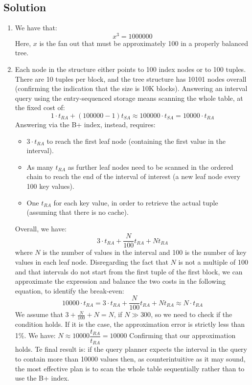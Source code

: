 \subsection*{Solution}
\begin{enumerate}
    \item We have that: 
        \[x^3=1000000\]
        Here, $x$ is the fan out that must be approximately 100 in a properly balanced tree.
    \item Each node in the structure either points to 100 index nodes or to 100 tuples. 
        There are 10 tuples per block, and the tree structure has 10101 nodes overall (confirming the indication that the size is 10K blocks).
        Answering an interval query using the entry-sequenced storage means scanning the whole table, at the fixed cost of: 
        \[1\cdot t_{RA}+(100000-1)t_{SA} \approx 100000\cdot t_{SA}=10000\cdot t_{RA}\]
        Answering via the B+ index, instead, requires:
        \begin{itemize}
            \item $3\cdot t_{RA}$ to reach the first leaf node (containing the first value in the interval). 
            \item As many $t_{RA}$ as further leaf nodes need to be scanned in the ordered chain to reach the end of the interval of interest (a new leaf node every 100 key values). 
            \item One $t_{RA}$ for each key value, in order to retrieve the actual tuple (assuming that there is no cache). 
        \end{itemize}
        Overall, we have: 
        \[3 \cdot t_{RA}+\dfrac{N}{100}t_{RA}+Nt_{RA}\]
        where $N$ is the number of values in the interval and 100 is the number of key values in each leaf node.
        Disregarding the fact that $N$ is not a multiple of 100 and that intervals do not start from the first tuple of the first block, we can approximate the expression and balance the two costs in the following equation, to identify the break-even:
        \[10000\cdot t_{RA}=3 \cdot t_{RA}+\dfrac{N}{100}t_{RA}+Nt_{RA} \approx N \cdot t_{RA}\]
        We assume that $3+\frac{N}{100}+N = N$, if $N \gg 300$, so we need to check if the condition holds. 
        If it is the case, the approximation error is strictly less than 1\%. 
        We have: 
        $N \approx 10000 \dfrac{t_{RA}}{t_{RA}}= 10000$
        Confirming that our approximation holds. 
        Te final result is: if the query planner expects the interval in the query to contain more than 10000 values then, as counterintuitive as it may sound, the most effective plan is to scan the whole table sequentially rather than to use the B+ index.
\end{enumerate}